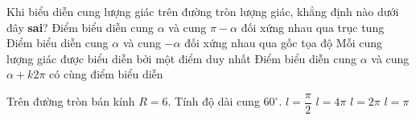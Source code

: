 \begin{ex}%
Khi biểu diễn cung lượng giác trên đường tròn lượng giác, khẳng định nào dưới đây \textbf{sai}?
\choice
{Điểm biểu diễn cung $\alpha$ và cung $\pi - \alpha$ đối xứng nhau qua trục tung}
{\True Điểm biểu diễn cung $\alpha$ và cung $- \alpha$ đối xứng nhau qua gốc tọa độ}
{Mỗi cung lượng giác được biểu diễn bởi một điểm duy nhất}
{Điểm biểu diễn cung $\alpha$ và cung $\alpha +k2\pi$ có cùng điểm biểu diễn }
\end{ex}

\begin{ex}%
Trên đường tròn bán kính $R=6$. Tính độ dài cung $60^\circ$.
\choice
{$l=\dfrac{\pi}{2}$}
{$l=4\pi$}
{\True $l=2\pi$}
{$l=\pi$}
\end{ex}



